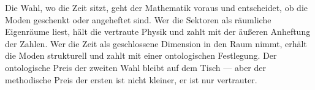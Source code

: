 Die Wahl, wo die Zeit sitzt, geht der Mathematik voraus und entscheidet,
ob die Moden geschenkt oder angeheftet sind. Wer die Sektoren als
räumliche Eigenräume liest, hält die vertraute Physik und zahlt mit
der äußeren Anheftung der Zahlen. Wer die Zeit als geschlossene
Dimension in den Raum nimmt, erhält die Moden strukturell und zahlt mit
einer ontologischen Festlegung. Der ontologische Preis der zweiten Wahl
bleibt auf dem Tisch --- aber der methodische Preis der ersten ist nicht
kleiner, er ist nur vertrauter.

